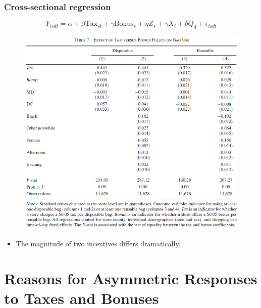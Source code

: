 \documentclass[dvipdfmx,11pt]{beamer}
\begin{document}
\begin{frame}\frametitle{Cross-sectional regression}
  \footnotesize
  \[
  Y_{isdt} = \alpha + \beta \text{Tax}_{st} + \gamma \text{Bonus}_{s} + \eta Z_s + \gamma X_i + \delta Q_d + \epsilon_{isdt}
  \]
  \begin{figure}[ht]
    \centering
    \includegraphics[scale = .45]{0807tanji/T7}
  \end{figure}
  \begin{itemize}
    \footnotesize
    \item The magnitude of two incentives differs dramatically.
  \end{itemize}
\end{frame}

\section{Reasons for Asymmetric Responses to Taxes and Bonuses}
\frame{\sectionpage}
\end{document}
